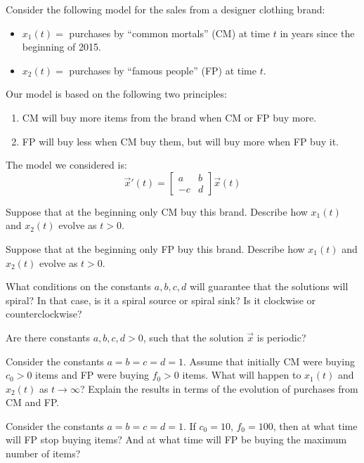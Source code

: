 \begin{lesson}
%
%	

\end{lesson}




\question
	Consider the following model for the sales from a designer clothing brand:
	\begin{itemize}
	\item $x_1(t) = $ purchases by ``common mortals'' (CM) at time $t$ in years since the beginning of 2015.
	\item $x_2(t) = $ purchases by ``famous people'' (FP) at time $t$.
	\end{itemize}
	
	Our model is based on the following two principles:
	\begin{enumerate}[label={($P_{\arabic*}$)}]
		\item CM will buy more items from the brand when CM or FP buy more.
		\item FP will buy less when CM buy them, but will buy more when FP buy it.
	\end{enumerate}

	The model we considered is:
	$$
	\vec{x}'(t) = 
	\begin{bmatrix}
 		a & b \\
 		-c & d
	\end{bmatrix}
	\vec{x}(t)
	$$
	
	\begin{parts}
		\item Suppose that at the beginning only CM buy this brand. Describe how $x_1(t)$ and $x_2(t)$ evolve as $t>0$.


		\item Suppose that at the beginning only FP buy this brand. Describe how $x_1(t)$ and $x_2(t)$ evolve as $t>0$.


		\item What conditions on the constants $a,b,c,d$ will guarantee that the solutions will spiral? In that case, is it a spiral source or spiral sink? Is it clockwise or counterclockwise?
		\item Are there constants $a,b,c,d>0$, such that the solution $\vec{x}$ is periodic?
		\item Consider the constants $a=b=c=d=1$. Assume that initially CM were buying $c_0>0$ items and FP were buying $f_0>0$ items.
			What will happen to $x_1(t)$ and $x_2(t)$ as $t \to \infty$? Explain the results in terms of the evolution of purchases from CM and FP.
		\item Consider the constants $a=b=c=d=1$.  If $c_0=10$, $f_0=100$, then at what time will FP stop buying items? And at what time will FP be buying the maximum number of items?
	
	\end{parts}




\bookonlynewpage


\hfill

\bookonlynewpage
\standardonlynewpage
